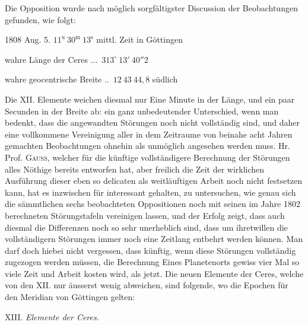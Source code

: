 \par\indent Die Opposition wurde nach möglich sorgfältigster Discussion der Beobachtungen gefunden, wie folgt:

\begin{center} 1808 Aug. 5. \quad $11^{\text{u}}\ 30^{\text{m}}\ 13^{\text{s}}$ mittl. Zeit in Göttingen

wahre Länge der Ceres .\;.\;.\;\ $313^\circ\ 13'\ 40''2$

wahre geocentrische Breite .\;.\;\ $12\ 43\ 44{,}8$ südlich
\end{center}

\par\indent Die XII. Elemente weichen diesmal nur Eine Minute in der Länge, und ein paar Secunden in der Breite ab: ein ganz unbedeutender Unterschied, wenn man bedenkt, dass die angewandten Störungen noch nicht vollständig sind, und daher eine vollkommene Vereinigung aller in dem Zeitraume von beinahe acht Jahren gemachten Beobachtungen ohnehin als unmöglich angesehen werden muss. Hr. Prof. \textsc{Gauss}, welcher für die künftige vollständigere Berechnung der Störungen alles Nöthige bereits entworfen hat, aber freilich die Zeit der wirklichen Ausführung dieser eben so delicaten als weitläuftigen Arbeit noch nicht festsetzen kann, hat es inzwischen für interessant gehalten, zu untersuchen, wie genau sich die sämmtlichen sechs beobachteten Oppositionen noch mit seinen im Jahre 1802 berechneten Störungstafeln vereinigen lassen, und der Erfolg zeigt, dass auch diesmal die Differenzen noch so sehr unerheblich sind, dass um ihretwillen die vollständigern Störungen immer noch eine Zeitlang entbehrt werden können. Man darf doch hiebei nicht vergessen, dass künftig, wenn diese Störungen vollständig zugezogen werden müssen, die Berechnung Eines Planetenorts gewiss vier Mal so viele Zeit und Arbeit kosten wird, als jetzt. Die neuen Elemente der Ceres, welche von den XII. nur äusserst wenig abweichen, sind folgende, wo die Epochen für den Meridian von Göttingen gelten:

\begin{center} XIII. \emph{Elemente der Ceres.}
\end{center}


